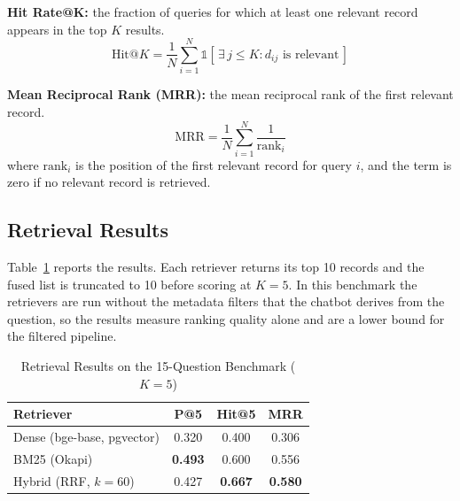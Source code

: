 \documentclass[conference]{IEEEtran}
\begin{document}
\textbf{Hit Rate@K:} the fraction of queries for which at least one
relevant record appears in the top $K$ results.
\begin{equation}
\mathrm{Hit@}K = \frac{1}{N}\sum_{i=1}^{N}
\mathbb{1}\left[\,\exists\, j \leq K : d_{ij} \text{ is relevant}\,\right]
\end{equation}

\textbf{Mean Reciprocal Rank (MRR):} the mean reciprocal rank of
the first relevant record.
\begin{equation}
\mathrm{MRR} =
\frac{1}{N}
\sum_{i=1}^{N}
\frac{1}{\mathrm{rank}_i}
\end{equation}
where $\mathrm{rank}_i$ is the position of the first relevant
record for query $i$, and the term is zero if no relevant record
is retrieved.

\subsection{Retrieval Results}

Table~\ref{tab:results} reports the results. Each retriever returns
its top 10 records and the fused list is truncated to 10 before
scoring at $K=5$. In this benchmark the retrievers are run without the
metadata filters that the chatbot derives from the question, so the
results measure ranking quality alone and are a lower bound for the
filtered pipeline.

\begin{table}[!t]
\centering
\caption{Retrieval Results on the 15-Question Benchmark ($K=5$)}
\label{tab:results}
\footnotesize
\begin{tabular}{@{}lccc@{}}
\toprule
\textbf{Retriever} & \textbf{P@5} & \textbf{Hit@5} & \textbf{MRR} \\
\midrule
Dense (bge-base, pgvector) & 0.320 & 0.400 & 0.306 \\
BM25 (Okapi)               & \textbf{0.493} & 0.600 & 0.556 \\
Hybrid (RRF, $k=60$)       & 0.427 & \textbf{0.667} & \textbf{0.580} \\
\bottomrule
\end{tabular}
\end{table}
\end{document}
